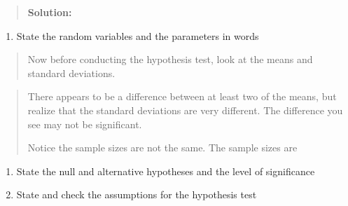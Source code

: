 \documentclass[]{book}
\providecommand{\tightlist}{%
  \setlength{\itemsep}{0pt}\setlength{\parskip}{0pt}}
\begin{document}
\begin{quote}
\textbf{Solution:}
\end{quote}

\begin{enumerate}
\def\labelenumi{\arabic{enumi}.}
\tightlist
\item
  State the random variables and the parameters in words
\end{enumerate}

\begin{quote}
Now before conducting the hypothesis test, look at the means and standard deviations.
\end{quote}

\begin{quote}
There appears to be a difference between at least two of the means, but realize that the standard deviations are very different. The difference you see may not be significant.

Notice the sample sizes are not the same. The sample sizes are
\end{quote}

\begin{enumerate}
\def\labelenumi{\arabic{enumi}.}
\setcounter{enumi}{1}
\item
  State the null and alternative hypotheses and the level of significance
\item
  State and check the assumptions for the hypothesis test
\end{enumerate}
\end{document}
